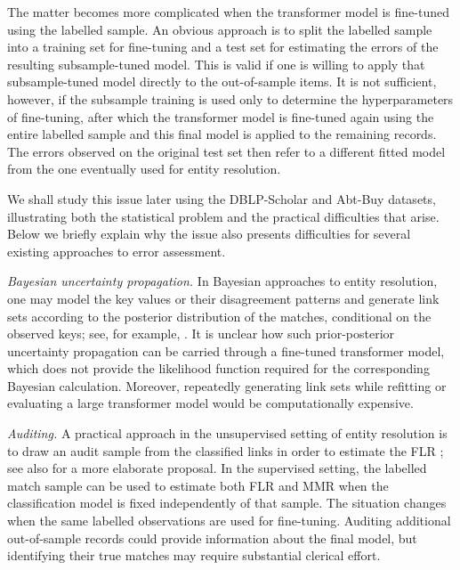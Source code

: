 The matter becomes more complicated when the transformer model is fine-tuned using the labelled sample. An obvious approach is to split the labelled sample into a training set for fine-tuning and a test set for estimating the errors of the resulting subsample-tuned model. This is valid if one is willing to apply that subsample-tuned model directly to the out-of-sample items. It is not sufficient, however, if the subsample training is used only to determine the hyperparameters of fine-tuning, after which the transformer model is fine-tuned again using the entire labelled sample and this final model is applied to the remaining records. The errors observed on the original test set then refer to a different fitted model from the one eventually used for entity resolution.

We shall study this issue later using the DBLP-Scholar and Abt-Buy datasets, illustrating both the statistical problem and the practical difficulties that arise. Below we briefly explain why the issue also presents difficulties for several existing approaches to error assessment.

\emph{Bayesian uncertainty propagation.}
In Bayesian approaches to entity resolution, one may model the key values or their disagreement patterns and generate link sets according to the posterior distribution of the matches, conditional on the observed keys; see, for example, \citet{tancredi2011hierarchical, sadinle2017bayesian, steorts2016bayesian}. It is unclear how such prior-posterior uncertainty propagation can be carried through a fine-tuned transformer model, which does not provide the likelihood function required for the corresponding Bayesian calculation. Moreover, repeatedly generating link sets while refitting or evaluating a large transformer model would be computationally expensive.

\emph{Auditing.}
A practical approach in the unsupervised setting of entity resolution is to draw an audit sample from the classified links in order to estimate the FLR \citep{christen2012data}; see also \citet{binette2024evaluation} for a more elaborate proposal. In the supervised setting, the labelled match sample can be used to estimate both FLR and MMR when the classification model is fixed independently of that sample. The situation changes when the same labelled observations are used for fine-tuning. Auditing additional out-of-sample records could provide information about the final model, but identifying their true matches may require substantial clerical effort.

